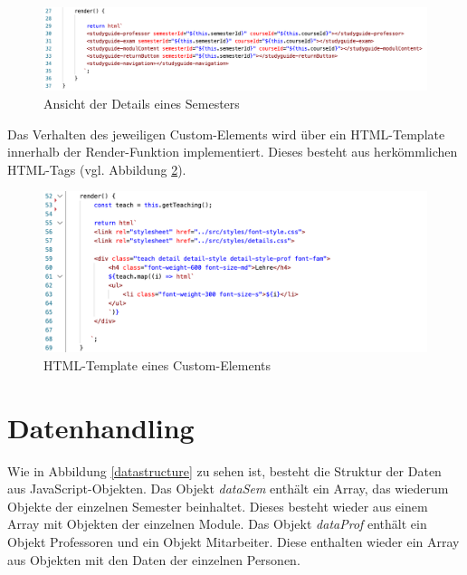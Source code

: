 \documentclass[12pt,					%
							 oneside,			%
							 a4paper,			%
							 halfparskip,		%
							 liststotoc,			%
							 bibtotoc,			%
							 fleqn,				%
							 pointlessnumbers]	%
							 {scrreprt}
\begin{document}
	\begin{figure}[h]
		\centering
		\includegraphics[width=1\textwidth]{pictures/custom-element.png}
		\caption{Ansicht der Details eines Semesters}						
		\label{custom-element}
	\end{figure}
	
	Das Verhalten des jeweiligen Custom-Elements wird über ein HTML-Template innerhalb der Render-Funktion implementiert. Dieses besteht aus herkömmlichen HTML-Tags (vgl. Abbildung \ref{html-template}).

	\begin{figure}[h]
		\centering
		\includegraphics[width=1\textwidth]{pictures/html-template.png}
		\caption{HTML-Template eines Custom-Elements}						
		\label{html-template}
	\end{figure}
\newpage	
	\section{Datenhandling}
	Wie in Abbildung \ref{datastructure} zu sehen ist, besteht die Struktur der Daten aus JavaScript-Objekten. Das Objekt \textit{dataSem} enthält ein Array, das wiederum Objekte der einzelnen Semester beinhaltet. Dieses besteht wieder aus einem Array mit Objekten der einzelnen Module.  Das Objekt \textit{dataProf} enthält ein Objekt Professoren und ein Objekt Mitarbeiter. Diese enthalten wieder ein Array aus Objekten mit den Daten der einzelnen Personen.
	
\end{document}
